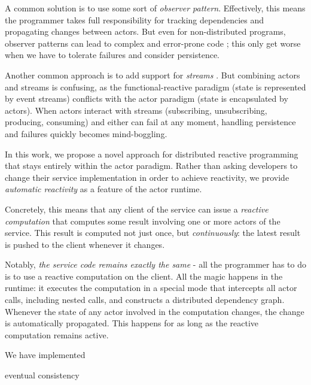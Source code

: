 A common solution is to use some sort of \emph{observer pattern}. Effectively, this means the programmer takes full responsibility for tracking dependencies and propagating changes between actors. But even for non-distributed programs, observer patterns can lead to complex and error-prone code \cite{}; this only get worse when we have to tolerate failures and consider persistence. 

Another common approach is to add support for \emph{streams} \cite{}. But combining actors and streams is confusing, as the functional-reactive paradigm (state is represented by event streams) conflicts with the actor paradigm (state is encapsulated by actors). When actors interact with streams (subscribing, unsubscribing, producing, consuming) and either can fail at any moment, handling persistence and failures quickly becomes mind-boggling.

In this work, we propose a novel approach for distributed reactive programming that stays entirely within the actor paradigm. Rather than asking developers to change their service implementation in order to achieve reactivity, we provide \emph{automatic reactivity} as a feature of the actor runtime. 

Concretely, this means that any client of the service can issue a \emph{reactive computation} that computes some result involving one or more actors of the service. This result is computed not just once, but \emph{continuously}: the latest result is pushed to the client whenever it changes. 

Notably, \emph{the service code remains exactly the same} - all the programmer has to do is to use a reactive computation on the client.  All the magic happens in the runtime: it executes the computation in a special mode that intercepts all actor calls, including nested calls, and constructs a distributed dependency graph. Whenever the state of any actor involved in the computation changes, the change is automatically  propagated. This happens for as long as the reactive computation remains active. 
 

We have implemented

eventual consistency
 

